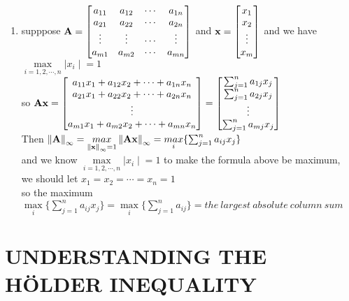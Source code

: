 \documentclass[english,onecolumn,UTF8]{IEEEtran}
\begin{document}
\begin{enumerate}
\begin{enumerate}
	\item supppose $\bold A =\begin{bmatrix}a_{11} & a_{12} & \cdots & a_{1n} \\ a_{21} & a_{22} & \cdots & a_{2n} \\ \vdots & \vdots & \cdots & \vdots \\ a_{m1} & a_{m2} & \cdots & a_{mn}\end{bmatrix}$ and $\bold x =\begin{bmatrix}x_{1}\\ x_{2}\\ \vdots \\ x_{m}\end{bmatrix}$ and we have $ \mathop{max}\limits_{i=1,2,\cdots,n} {\mid x_i \mid}=1$
\\so $\bold {Ax}= \begin{bmatrix}a_{11}x_{1}+a_{12}x_{2}+\cdots +a_{1n}x_{n}\\ a_{21}x_{1}+a_{22}x_{2}+\cdots +a_{2n}x_{n}\\ \vdots \\a_{m1}x_{1}+a_{m2}x_{2}+\cdots +a_{mn}x_{n}\end{bmatrix} = \begin{bmatrix} \sum_{j=1}^n a_{1j}x_j \\ \sum_{j=1}^n a_{2j}x_j \\ \vdots \\ \sum_{j=1}^n a_{mj}x_j \end{bmatrix}$
\\Then $\left \| \bold A \right \|_\infty= \mathop{max}\limits_{\left \| \bold {x} \right \|_\infty=1}\left \| \bold {Ax} \right \|_\infty=\mathop{max}\limits_{i}\{ \sum_{j=1}^n a_{ij}x_j   \}$
\\and we know $ \mathop{max}\limits_{i=1,2,\cdots,n} {\mid x_i \mid}=1$ to make the formula above be maximum,
\\we should let $x_1=x_2= \cdots = x_n=1$
\\so the maximum $\mathop{max}\limits_{i}\{ \sum_{j=1}^n a_{ij}x_j \}=\mathop{max}\limits_{i}\{ \sum_{j=1}^n a_{ij}\}= the\  largest\  absolute\  column\  sum$

	\end{enumerate}

\end{enumerate}




\section{UNDERSTANDING THE HÖLDER INEQUALITY}
\end{document}
